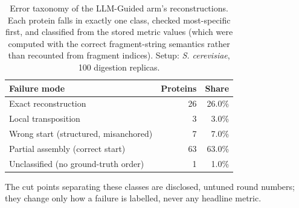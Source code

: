\begin{table}[!tb]
  \centering
  \caption{Error taxonomy of the LLM-Guided arm's reconstructions. Each protein falls in exactly one class, checked most-specific first, and classified from the stored metric values (which were computed with the correct fragment-string semantics rather than recounted from fragment indices). Setup: \textnormal{\textnormal{\textit{S. cerevisiae}}}, 100 digestion replicas.}
  \label{tab:error_taxonomy_yeast_r100}
  \begin{tabular}{lrr}
    \toprule
    Failure mode & Proteins & Share \\
    \midrule
    Exact reconstruction & 26 & 26.0\% \\
    Local transposition & 3 & 3.0\% \\
    Wrong start (structured, misanchored) & 7 & 7.0\% \\
    Partial assembly (correct start) & 63 & 63.0\% \\
    Unclassified (no ground-truth order) & 1 & 1.0\% \\
    \bottomrule
  \end{tabular}
  \par\smallskip\footnotesize{The cut points separating these classes are disclosed, untuned round numbers; they change only how a failure is labelled, never any headline metric.}
\end{table}
